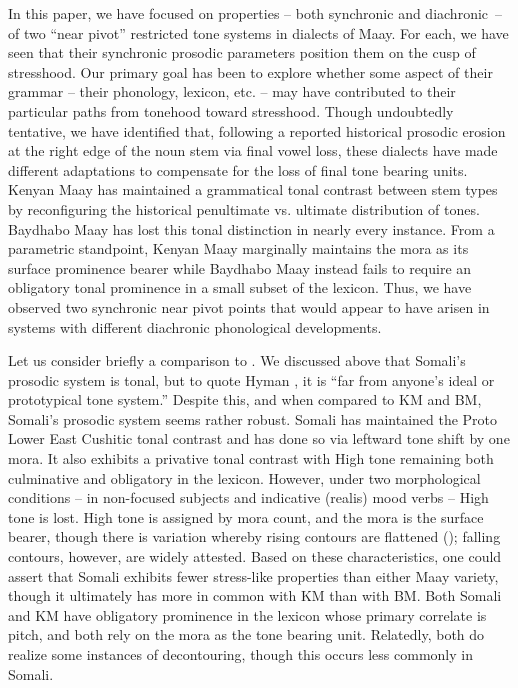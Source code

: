\documentclass[output=paper,colorlinks,citecolor=brown]{langscibook}
\begin{document}
In this paper, we have focused on properties -- both synchronic and diachronic~-- of two ``near pivot'' restricted tone systems in dialects of Maay. For each, we have seen that their synchronic prosodic parameters position them on the cusp of stresshood. Our primary goal has been to explore whether some aspect of their grammar -- their phonology, lexicon, etc. -- may have contributed to their particular paths  from tonehood toward stresshood. Though undoubtedly tentative, we have identified that, following a reported historical  prosodic erosion at the right edge of the noun stem via final vowel loss, these dialects have made  different adaptations to compensate for the loss of final tone bearing units. Kenyan Maay has maintained a grammatical tonal contrast between stem types by reconfiguring the historical penultimate vs. ultimate distribution of tones. Baydhabo Maay has lost this tonal distinction in nearly every instance. From a parametric standpoint, Kenyan Maay marginally maintains the mora as its surface prominence bearer while Baydhabo Maay instead fails to require an obligatory tonal prominence in a small subset of the lexicon. Thus, we have observed two synchronic near pivot points that would appear to have arisen in systems with different diachronic phonological developments. 

Let us consider briefly a comparison to . We discussed above that Somali's prosodic system is tonal, but to quote Hyman \citeyearpar[216]{Hyman2009}, it is ``far from anyone's ideal or prototypical tone system.'' Despite this, and when compared to KM and BM, Somali's prosodic system seems rather robust. Somali has maintained the Proto Lower East Cushitic tonal contrast and has done so via leftward tone shift by one mora. It also exhibits a privative  tonal contrast with High tone remaining both culminative  and  obligatory in the lexicon. However, under two morphological conditions -- in non-focused subjects and indicative (realis) mood verbs -- High tone is lost. High tone is assigned by mora count, and the mora is the surface  bearer, though there is variation whereby rising contours are flattened (\citealt{banti88}); falling contours, however, are widely attested. Based on these characteristics, one could assert that Somali exhibits fewer stress-like properties than either Maay variety, though it ultimately has more in common with KM than with BM. Both Somali and KM have obligatory prominence in the lexicon whose primary correlate is pitch, and both rely on the mora as the tone bearing unit. Relatedly, both do realize some instances of decontouring, though this occurs less commonly in Somali. 
\end{document}
